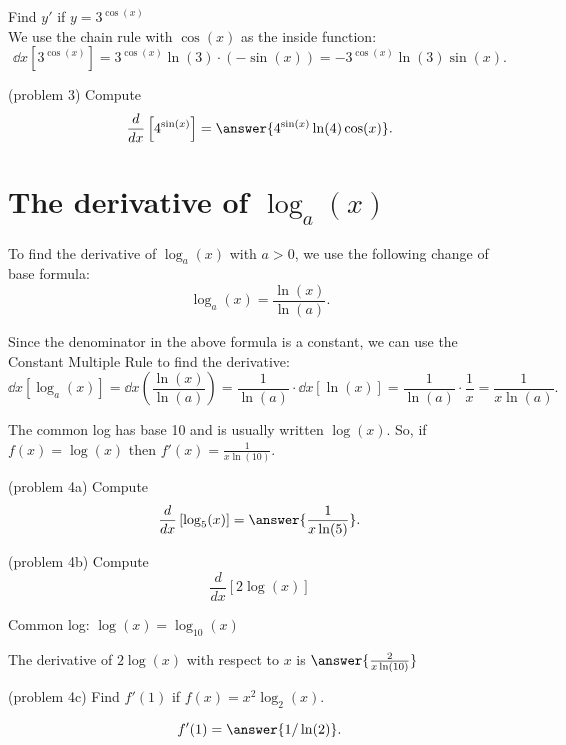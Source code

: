 \documentclass[handout]{ximera}
\begin{document}
\begin{example}[example 3]
Find $y'$ if $y = 3^{\cos(x)}$\\
We use the chain rule with $\cos(x)$ as the inside function:
\[
\dd{x} \left[3^{\cos(x)}\right] = 3^{\cos(x)} \ln(3) \cdot (-\sin(x)) = -3^{\cos(x)} \ln(3) \sin(x).
\]
\end{example}

\begin{problem}(problem 3)
Compute
\[
\dd{x} \left[ 4^{\sin(x)}\right] = \answer{4^{\sin(x)}\ln(4) \cos(x)}.
\]
\end{problem}


\section{The derivative of $\log_a(x)$}


To find the derivative of $\log_a(x)$ with $a > 0$, we use the following change of base formula:
\[
\log_a(x) = \frac{\ln(x)}{\ln(a)}.
\]

Since the denominator in the above formula is a constant, we can use the Constant Multiple Rule to find the derivative:
\[
\dd{x} \left[\log_a(x)\right] = \dd{x} \left(\frac{\ln(x)}{\ln(a)}\right) = \frac{1}{\ln(a)}\cdot \dd{x} \left[\ln(x)\right] = \frac{1}{\ln(a)} \cdot \frac{1}{x} = \frac{1}{x\ln(a)}.
\]


\begin{example}[example 4]
The common log has base 10 and is usually written $\log(x)$.
So, if $f(x) = \log(x)$ then $f'(x) = \frac{1}{x\ln(10)}.$
\end{example}



\begin{problem}(problem 4a)
Compute
\[
\ddx \left[\log_5(x)\right] = \answer{\frac{1}{x\ln(5)}}.
\]
\end{problem}


\begin{problem}(problem 4b)
  Compute 
  \[
  \frac{d}{dx} \left[2\log(x)\right]
  \]
  
		\begin{hint}
		  Common log: $\log(x) = \log_{10}(x)$ 
		\end{hint}
	
		
		The derivative of $2\log(x)$ with respect to $x$ is
		 $\answer{\frac{2}{x\ln(10)}}$
	
\end{problem}


\begin{problem}(problem 4c)
Find $f'(1)$ if $f(x) = x^2 \log_2(x)$.

\[
f'(1) = \answer{1/\ln(2)}.
\]

\end{problem}
\end{document}
